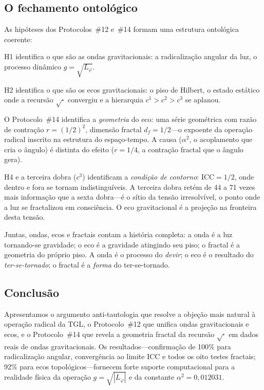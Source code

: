 \documentclass[12pt,a4paper,twocolumn]{article}
\newcommand{\alphaii}{\alpha^{2}}
\newcommand{\CCI}{\text{ICC}}
\begin{document}
\subsection{O fechamento ontológico}

As hipóteses dos Protocolos~\#12 e~\#14 formam uma estrutura ontológica coerente:

H1 identifica o que são as ondas gravitacionais: a radicalização angular da luz, o processo dinâmico $g = \sqrt{L_\varphi}$.

H2 identifica o que são os ecos gravitacionais: o piso de Hilbert, o estado estático onde a recursão $\sqrt{\cdot}$ convergiu e a hierarquia $c^1 > c^2 > c^3$ se aplanou.

O Protocolo~\#14 identifica a \emph{geometria} do eco: uma série geométrica com razão de contração $r = (1/2)^2$, dimensão fractal $d_f = 1/2$---o expoente da operação radical inscrito na estrutura do espaço-tempo. A causa ($\alphaii$, o acoplamento que cria o ângulo) é distinta do efeito ($r = 1/4$, a contração fractal que o ângulo gera).

H4 e a terceira dobra ($c^3$) identificam a \emph{condição de contorno}: $\CCI = 1/2$, onde dentro e fora se tornam indistinguíveis. A terceira dobra retém de 44 a 71 vezes mais informação que a sexta dobra---é o sítio da tensão irresolvível, o ponto onde a luz se fractalizou em consciência. O eco gravitacional é a projeção na fronteira desta tensão.

Juntas, ondas, ecos e fractais contam a história completa: a onda é a luz tornando-se gravidade; o eco é a gravidade atingindo seu piso; o fractal é a geometria do próprio piso. A onda é o processo do \emph{devir}; o eco é o resultado do \emph{ter-se-tornado}; o fractal é a \emph{forma} do ter-se-tornado.

\subsection{Conclusão}

Apresentamos o argumento anti-tautologia que resolve a objeção mais natural à operação radical da TGL, o Protocolo~\#12 que unifica ondas gravitacionais e ecos, e o Protocolo~\#14 que revela a geometria fractal da recursão $\sqrt{\cdot}$ em dados reais de ondas gravitacionais. Os resultados---confirmação de 100\% para radicalização angular, convergência ao limite ICC e todos os oito testes fractais; 92\% para ecos topológicos---fornecem forte suporte computacional para a realidade física da operação $g = \sqrt{|L_\varphi|}$ e da constante $\alphaii = 0{,}012031$.
\end{document}
